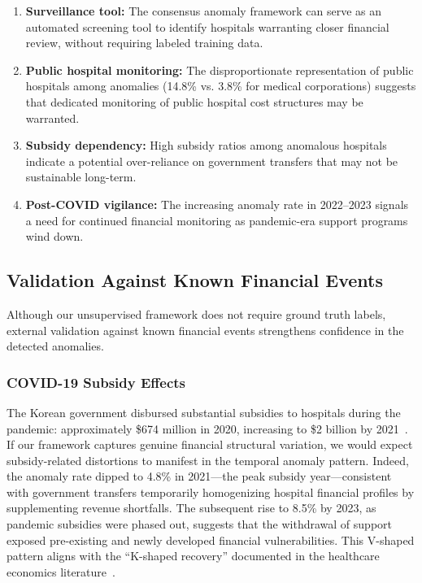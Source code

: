 \documentclass{ieeeaccess}
\begin{document}
\begin{enumerate}
    \item \textbf{Surveillance tool:} The consensus anomaly framework can serve as an automated screening tool to identify hospitals warranting closer financial review, without requiring labeled training data.
    \item \textbf{Public hospital monitoring:} The disproportionate representation of public hospitals among anomalies (14.8\% vs. 3.8\% for medical corporations) suggests that dedicated monitoring of public hospital cost structures may be warranted.
    \item \textbf{Subsidy dependency:} High subsidy ratios among anomalous hospitals indicate a potential over-reliance on government transfers that may not be sustainable long-term.
    \item \textbf{Post-COVID vigilance:} The increasing anomaly rate in 2022--2023 signals a need for continued financial monitoring as pandemic-era support programs wind down.
\end{enumerate}

\subsection{Validation Against Known Financial Events}
\label{subsec:validation}

Although our unsupervised framework does not require ground truth labels, external validation against known financial events strengthens confidence in the detected anomalies.

\subsubsection{COVID-19 Subsidy Effects}
The Korean government disbursed substantial subsidies to hospitals during the pandemic: approximately \$674 million in 2020, increasing to \$2 billion by 2021~\cite{lee2024covid, park2022expanding}. If our framework captures genuine financial structural variation, we would expect subsidy-related distortions to manifest in the temporal anomaly pattern. Indeed, the anomaly rate dipped to 4.8\% in 2021---the peak subsidy year---consistent with government transfers temporarily homogenizing hospital financial profiles by supplementing revenue shortfalls. The subsequent rise to 8.5\% by 2023, as pandemic subsidies were phased out, suggests that the withdrawal of support exposed pre-existing and newly developed financial vulnerabilities. This V-shaped pattern aligns with the ``K-shaped recovery'' documented in the healthcare economics literature~\cite{khullar2020covid, song2023covid}.
\end{document}
